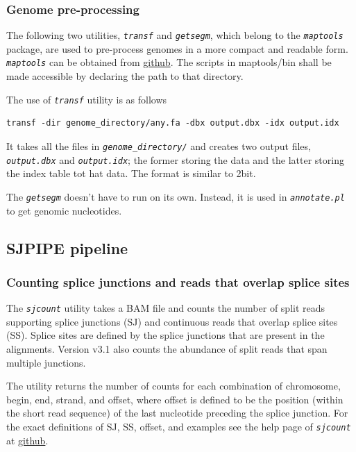 \documentclass{article}
\newcommand{\prog}[1]{{\tt\em #1}}
\begin{document}

\subsubsection{Genome pre-processing}
The following two utilities, \prog{transf} and \prog{getsegm}, which belong to the \prog{maptools} package, are used to pre-process genomes in a more compact and
readable form. \prog{maptools} can be obtained from \href{https://github.com/pervouchine/maptools}{github}. The scripts in maptools/bin shall be made accessible
by declaring the path to that directory.

The use of \prog{transf} utility is as follows
\begin{verbatim} 
transf -dir genome_directory/any.fa -dbx output.dbx -idx output.idx
\end{verbatim}

It takes all the files in \prog{genome\_directory/} and creates two output files, \prog{output.dbx} and \prog{output.idx}; the former storing the data and the latter 
storing the index table tot hat data. The format is similar to 2bit. 

The \prog{getsegm} doesn't have to run on its own. Instead, it is used in \prog{annotate.pl} to get genomic nucleotides.



\subsection{SJPIPE pipeline}

\subsubsection{Counting splice junctions and reads that overlap splice sites}
The \prog{sjcount} utility takes a  BAM file and counts the number of split reads supporting splice junctions (SJ) and continuous reads 
that overlap splice sites (SS). Splice sites are defined by the splice junctions that are present in the alignments.
Version v3.1 also counts the abundance of split reads that span multiple junctions.

The utility returns the number of counts for each combination of chromosome, begin, end, strand, and offset, where offset is defined to 
be the position (within the short read sequence) of the last nucleotide preceding the splice junction. For the exact definitions of SJ, SS, 
offset, and examples see the help page of \prog{sjcount} at \href{https://github.com/pervouchine/sjcount}{github}. 
\end{document}
